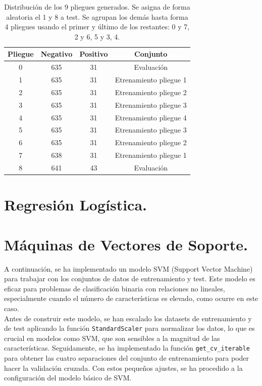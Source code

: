 \documentclass[12pt,letterpaper]{article}
\begin{document}
\begin{table}[htp]
    \centering
    \begin{tabular}{cccc}
    \hline
    \textbf{Pliegue} & \textbf{Negativo} & \textbf{Positivo} & \textbf{Conjunto}\\ \hline
        0 & 635 & 31 & Evaluación \\ 
        1 & 635 & 31 & Etrenamiento pliegue 1 \\ 
        2 & 635 & 31 & Etrenamiento pliegue 2\\ 
        3 & 635 & 31 & Etrenamiento pliegue 3\\ 
        4 & 635 & 31 & Etrenamiento pliegue 4\\ 
        5 & 635 & 31 & Etrenamiento pliegue 3\\ 
        6 & 635 & 31 & Etrenamiento pliegue 2 \\
        7 & 638 & 31 & Etrenamiento pliegue 1\\ 
        8 & 641 & 43 & Evaluación \\ \hline
    \end{tabular}
    \caption{Distribución de los 9 pliegues generados. Se asigna de forma aleatoria el 1 y 8 a test. Se agrupan los demás hasta forma 4 pliegues usando el primer y último de los restantes: 0 y 7, 2 y 6, 5 y 3, 4.}
    \label{tab:ValidacionCruzada}
\end{table}

\section{Regresión Logística.}
\section{Máquinas de Vectores de Soporte.}
A continuación, se ha implementado un modelo SVM (Support Vector Machine) para trabajar con los conjuntos de datos de entrenamiento y test. Este modelo es eficaz para problemas de clasificación binaria con relaciones no lineales, especialmente cuando el número de características es elevado, como ocurre en este caso.\\
Antes de construir este modelo, se han escalado los datasets de entrenamiento y de test aplicando la función \texttt{StandardScaler} para normalizar los datos, lo que es crucial en modelos como SVM, que son sensibles a la magnitud de las características. Seguidamente, se ha implementado la función \texttt{get\_cv\_iterable} para obtener las cuatro separaciones del conjunto de entrenamiento para poder hacer la validación cruzada. Con estos pequeños ajustes, se ha procedido a la configuración del modelo básico de SVM. \\
\end{document}
